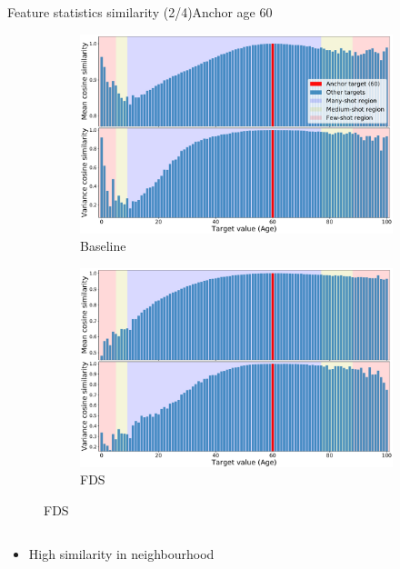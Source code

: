 \begin{frame}{Feature statistics similarity (2/4)}{Anchor age 60}
	\begin{figure}[h]
		\begin{subfigure}{0.48\textwidth}
			\includegraphics[width=\linewidth]{images/feat_sim_fds_base_60.pdf}
			\caption{Baseline}
		\end{subfigure}\hspace{1em}%
		\begin{subfigure}{0.48\textwidth}
			\includegraphics[width=\linewidth]{images/feat_sim_fds_ours_60.pdf}
			\caption{FDS}
		\end{subfigure}
	\end{figure}
	\vspace{-1em}
	\begin{columns}
		\footnotesize
		\begin{column}{0.5\textwidth}
			\begin{itemize}
				\item High similarity in neighbourhood

\end{itemize}
\end{column}
\end{columns}
\end{frame}
